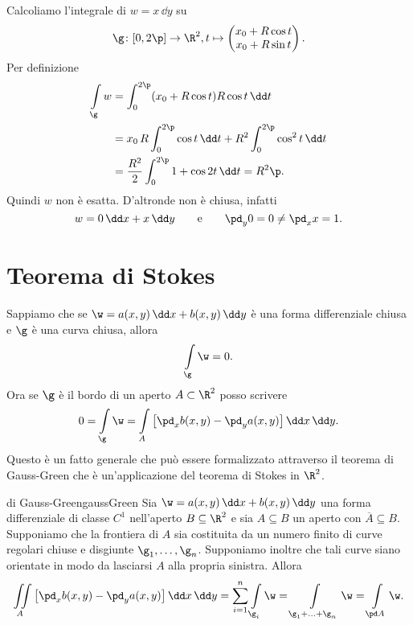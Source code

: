 \begin{ese}
	Calcoliamo l'integrale di \(w = x\,\dd y\) su
	\[
		\g\colon [0,2\p]\to \R^2, t\mapsto \begin{pmatrix}x_0+R\cos t\\x_0+R\sin t\end{pmatrix}.
	\]
	Per definizione
	\[
		\begin{split}
			\int\limits_\g w & = \int_0^{2\p} (x_0+R\cos t)R\cos t\,\dd t\\
			& = x_0\,R \int_0^{2\p} \cos t\,\dd t + R^2 \int_0^{2\p} \cos^2 t\,\dd t\\
			& = \frac{R^2}{2} \int_0^{2\p} 1+\cos 2t\,\dd t = R^2 \p.
		\end{split}
	\]
	Quindi \(w\) non è esatta. D'altronde non è chiusa, infatti
	\[
		w = 0\,\dd x+ x\,\dd y \qquad\text{e}\qquad \pd_y 0 = 0 \neq \pd_x x = 1.
	\]
\end{ese}
%
%
\section{Teorema di Stokes}

Sappiamo che se \(\w=a(x,y)\,\dd x+b(x,y)\,\dd y\) è una forma differenziale chiusa e \(\g\) è una curva chiusa, allora
\[
	\int\limits_\g \w = 0.
\]
Ora se \(\g\) è il bordo di un aperto \(A\subset\R^2\) posso scrivere
\[
	0 = \int\limits_\g \w = \int\limits_A \big[\pd_x b(x,y)-\pd_y a(x,y)\big]\,\dd x\,\dd y.
\]
Questo è un fatto generale che può essere formalizzato attraverso il teorema di Gauss-Green che è un'applicazione del teorema di Stokes in \(\R^2\).

\begin{teor}{di Gauss-Green}{gaussGreen}
	Sia \(\w=a(x,y)\,\dd x+b(x,y)\,\dd y\) una forma differenziale di classe \(C^1\) nell'aperto \(B\subseteq \R^2\) e sia \(A\subseteq B\) un aperto con \(\overline{A}\subseteq B\).
	Supponiamo che la frontiera di \(A\) sia costituita da un numero finito di curve regolari chiuse e disgiunte \(\g_1,\ldots,\g_n\).
	Supponiamo inoltre che tali curve siano orientate in modo da lasciarsi \(A\) alla propria sinistra.
	Allora
	\[
		\iint\limits_A \big[\pd_x b(x,y)-\pd_y a(x,y)\big]\,\dd x\,\dd y = \sum_{i=1}^n \int\limits_{\g_i} \w = \int\limits_{\g_1+\ldots+\g_n} \w = \int\limits_{\pd A} \w.
	\]
\end{teor}

